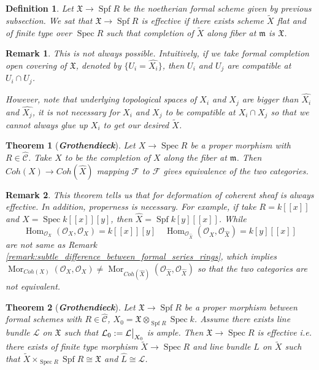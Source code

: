 \documentclass{ctexart}
\newtheorem{definition}{Definition}[section]
\newtheorem{remark}{Remark}[section]
\newtheorem{theorem}{Theorem}[section]
\renewcommand{\hom}{\operatorname{Hom}}
\newcommand{\mor}{\operatorname{Mor}}
\newcommand{\spec}{\operatorname{Spec}}
\newcommand{\spf}{\operatorname{Spf}}
\begin{document}
\begin{definition}
    Let $\mathfrak{X} \rightarrow \spf R$ be the noetherian formal scheme given by previous subsection.
    We sat that $\mathfrak{X} \rightarrow \spf R$ is effective if there exists scheme $\widetilde{X}$ flat and of finite type over $\spec R$ such that completion of $\widetilde{X}$ along fiber at $\mathfrak{m}$ is $\mathfrak{X}$.
\end{definition}
\begin{remark}
    This is not always possible. 
    Intuitively, if we take formal completion open covering of $\mathfrak{X}$, denoted by $\{U_{i} = \widehat{X_{i}}\}$,
    then $U_{i}$ and $U_{j}$ are compatible at $U_{i} \cap U_{j}$.
    \par
    However, note that underlying topological spaces of $X_{i}$ and $X_{j}$ are bigger than $\widehat{X_{i}}$ and $\widehat{X_{j}}$,
    it is not necessary for $X_{i}$ and $X_{j}$ to be compatible at $X_{i} \cap X_{j}$ so that we cannot always glue up $X_{i}$ to get our desired $\widetilde{X}$.
\end{remark}
\begin{theorem}[\textbf{\emph{Grothendieck}}]
    Let $X \rightarrow \spec R$ be a proper morphism with $R\in \widehat{\mathcal{C}}$.
    Take $\widehat{X}$ to be the completion of $X$ along the fiber at $\mathfrak{m}$.
    Then $Coh(X) \rightarrow Coh(\widehat{X})$ mapping $\mathcal{F}$ to $\widehat{\mathcal{F}}$ gives equivalence of the two categories.
    \label{Theorem 5.1}
\end{theorem}
\begin{remark}
    This theorem tells us that for deformation of coherent sheaf is always effective.
    In addition, properness is necessary.
    For example, if take $R = k[[x]]$ and $X = \spec k[[x]][y]$, then $\widehat{X} = \spf k[y][[x]]$.
    While 
    \begin{equation}
        \hom_{\mathcal{O}_{X}}(\mathcal{O}_{X}, \mathcal{O}_{X}) = k[[x]][y]\quad \hom_{\mathcal{O}_{\widehat{X}}}(\mathcal{O}_{\widehat{X}}, \mathcal{O}_{\widehat{X}}) = k[y][[x]]
    \end{equation}
    are not same as Remark \ref{remark:subtle_difference_between_formal_series_rings},
    which implies $\mor_{Coh(X)}(\mathcal{O}_{X}, \mathcal{O}_{X}) \neq \mor_{Coh(\widehat{X})}(\mathcal{O}_{\widehat{X}}, \mathcal{O}_{\widehat{X}})$ so that the two categories are not equivalent.
\end{remark}
\begin{theorem}[\textbf{\emph{Grothendieck}}]
    Let $\mathfrak{X} \rightarrow \spf R$ be a proper morphism between formal schemes with $R\in \widehat{\mathcal{C}}$, $X_{0} = \mathfrak{X} \otimes_{\spf R} \spec k$.
    Assume there exists line bundle $\mathcal{L}$ on $\mathfrak{X}$ such that $\mathcal{L}_{0} := \mathcal{L}\big{|}_{X_{0}}$ is ample.
    Then $\mathfrak{X} \rightarrow \spec R$ is effective i.e. there exists of finite type morphism $\widetilde{X} \rightarrow \spec R$ and line bundle $L$ on $\widetilde{X}$ such that $\widetilde{X} \times_{\spec R} \spf R \cong \mathfrak{X}$ and $\widehat{L} \cong \mathcal{L}$.
    \label{Theorem 5.2}
\end{theorem}
\end{document}
